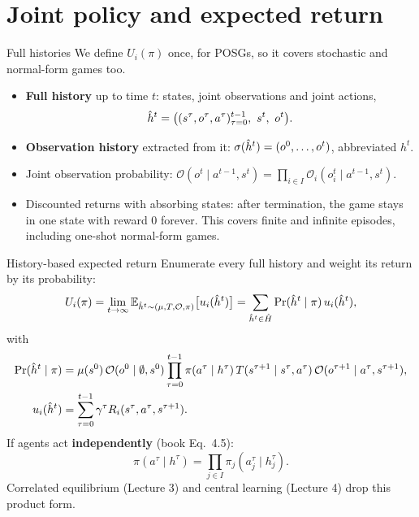 \documentclass[aspectratio=169,11pt]{beamer}
\begin{document}
\section{Joint policy and expected return}

\begin{frame}{Full histories}
  We define $U_i(\pi)$ once, for POSGs, so it covers stochastic and normal-form games too.
  \bigskip

  \begin{itemize}
    \item \textbf{Full history} up to time $t$: states, joint observations and joint actions,
      \[
        \hat{h}^t = \big( (s^\tau, o^\tau, a^\tau)_{\tau=0}^{t-1},\ s^t,\ o^t \big).
      \]
    \item \textbf{Observation history} extracted from it: $\sigma(\hat{h}^t) = (o^0, \dots, o^t)$, abbreviated $h^t$.
    \item Joint observation probability: $\mathcal{O}(o^t \mid a^{t-1}, s^t) = \prod_{i \in I} \mathcal{O}_i(o_i^t \mid a^{t-1}, s^t)$.
    \item Discounted returns with absorbing states: after termination, the game stays in one state with reward 0 forever. This covers finite and infinite episodes, including one-shot normal-form games.
  \end{itemize}
\end{frame}

\begin{frame}{History-based expected return}
  Enumerate every full history and weight its return by its probability:
  \[
    U_i(\pi) = \lim_{t \to \infty} \mathbb{E}_{\hat{h}^t \sim (\mu, T, \mathcal{O}, \pi)} \big[ u_i(\hat{h}^t) \big]
    = \sum_{\hat{h}^t \in \hat H} \Pr(\hat{h}^t \mid \pi)\, u_i(\hat{h}^t),
  \]
  with
  \begin{align*}
    \Pr(\hat{h}^t \mid \pi) &= \mu(s^0)\, \mathcal{O}(o^0 \mid \emptyset, s^0) \prod_{\tau=0}^{t-1} \pi(a^\tau \mid h^\tau)\, T(s^{\tau+1} \mid s^\tau, a^\tau)\, \mathcal{O}(o^{\tau+1} \mid a^\tau, s^{\tau+1}), \\
    u_i(\hat{h}^t) &= \sum_{\tau=0}^{t-1} \gamma^\tau R_i(s^\tau, a^\tau, s^{\tau+1}).
  \end{align*}
  If agents act \textbf{independently} (book Eq.\ 4.5):
  \[
    \pi(a^\tau \mid h^\tau) = \prod_{j \in I} \pi_j(a_j^\tau \mid h_j^\tau).
  \]
  Correlated equilibrium (Lecture 3) and central learning (Lecture 4) drop this product form.
\end{frame}
\end{document}

